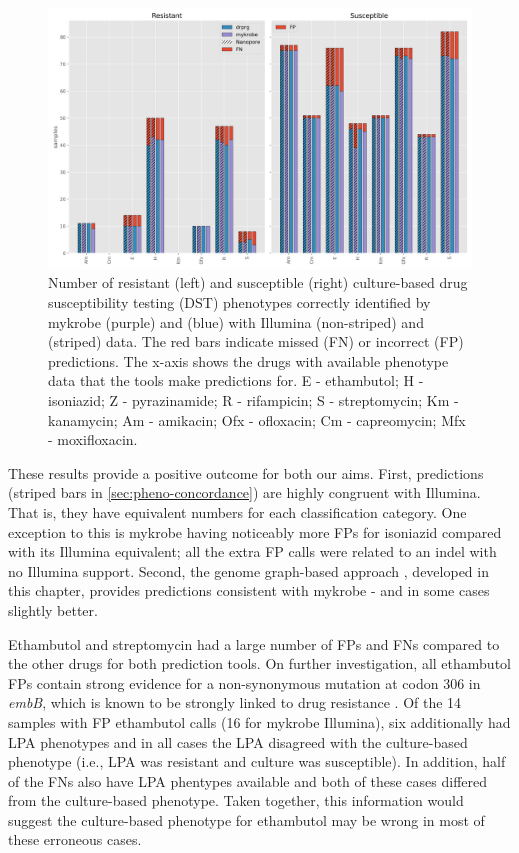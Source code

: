 \begin{figure}
\begin{center}
\includegraphics[width=0.90\columnwidth]{Chapter3/Figs/pheno_concordance_plot.png}
\caption{{Number of resistant (left) and susceptible (right) culture-based drug susceptibility testing (DST) phenotypes correctly identified by mykrobe (purple) and \drprg{} (blue) with Illumina (non-striped) and \ont{} (striped) data. The red bars indicate missed (FN) or incorrect (FP) predictions. The x-axis shows the drugs with available phenotype data that the tools make predictions for. E - ethambutol; H - isoniazid; Z - pyrazinamide; R - rifampicin; S - streptomycin; Km - kanamycin; Am - amikacin; Ofx - ofloxacin; Cm - capreomycin; Mfx - moxifloxacin.
{\label{fig:pheno-concordance}}
}}
\end{center}
\end{figure}

These results provide a positive outcome for both our aims. First, \ont{} predictions (striped bars in \autoref{sec:pheno-concordance}) are highly congruent with Illumina. That is, they have equivalent numbers for each classification category. One exception to this is mykrobe \ont{} having noticeably more FPs for isoniazid compared with its Illumina equivalent; all the extra FP calls were related to an indel with no Illumina support. Second, the genome graph-based approach \drprg{}, developed in this chapter, provides predictions consistent with mykrobe - and in some cases slightly better. 

Ethambutol and streptomycin had a large number of FPs and FNs compared to the other drugs for both prediction tools. On further investigation, all ethambutol FPs contain strong evidence for a non-synonymous mutation at codon 306 in \textit{embB}, which is known to be strongly linked to drug resistance \cite{Maningi2017,Srivastava2009,Brossier2015}. Of the 14 samples with FP ethambutol calls (16 for mykrobe Illumina), six additionally had LPA phenotypes and in all cases the LPA disagreed with the culture-based phenotype (i.e., LPA was resistant and culture was susceptible). In addition, half of the FNs also have LPA phentypes available and both of these cases differed from the culture-based phenotype. Taken together, this information would suggest the culture-based phenotype for ethambutol may be wrong in most of these erroneous cases.

